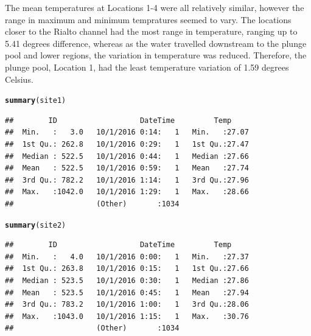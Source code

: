 \documentclass{article}\usepackage[]{graphicx}\usepackage[]{color}
\makeatletter
\newcommand{\hlstd}[1]{\textcolor[rgb]{0.345,0.345,0.345}{#1}}%
\newcommand{\hlkwd}[1]{\textcolor[rgb]{0.737,0.353,0.396}{\textbf{#1}}}%
\newenvironment{kframe}{%
 \def\at@end@of@kframe{}%
 \ifinner\ifhmode%
  \def\at@end@of@kframe{\end{minipage}}%
  \begin{minipage}{\columnwidth}%
 \fi\fi%
 \def\FrameCommand##1{\hskip\@totalleftmargin \hskip-\fboxsep
 \colorbox{shadecolor}{##1}\hskip-\fboxsep
     \hskip-\linewidth \hskip-\@totalleftmargin \hskip\columnwidth}%
 \MakeFramed {\advance\hsize-\width
   \@totalleftmargin\z@ \linewidth\hsize
   \@setminipage}}%
 {\par\unskip\endMakeFramed%
 \at@end@of@kframe}
\newenvironment{knitrout}{}{} %
\makeatother
\begin{document}
The mean temperatures at Locations 1-4 were all relatively similar, however the range in maximum and minimum tempratures seemed to vary. The locations closer to the Rialto channel had the most range in temperature, ranging up to 5.41 degrees difference, whereas as the water travelled downstream to the plunge pool and lower regions, the variation in temperature was reduced. Therefore, the plunge pool, Location 1, had the least temperature variation of 1.59 degrees Celsius.
\begin{knitrout}
\color{fgcolor}\begin{kframe}
\begin{alltt}
\hlkwd{summary}\hlstd{(site1)}
\end{alltt}
\begin{verbatim}
##        ID                   DateTime         Temp      
##  Min.   :   3.0   10/1/2016 0:14:   1   Min.   :27.07  
##  1st Qu.: 262.8   10/1/2016 0:29:   1   1st Qu.:27.47  
##  Median : 522.5   10/1/2016 0:44:   1   Median :27.66  
##  Mean   : 522.5   10/1/2016 0:59:   1   Mean   :27.74  
##  3rd Qu.: 782.2   10/1/2016 1:14:   1   3rd Qu.:27.96  
##  Max.   :1042.0   10/1/2016 1:29:   1   Max.   :28.66  
##                   (Other)       :1034
\end{verbatim}
\end{kframe}
\end{knitrout}

\begin{knitrout}
\color{fgcolor}\begin{kframe}
\begin{alltt}
\hlkwd{summary}\hlstd{(site2)}
\end{alltt}
\begin{verbatim}
##        ID                   DateTime         Temp      
##  Min.   :   4.0   10/1/2016 0:00:   1   Min.   :27.37  
##  1st Qu.: 263.8   10/1/2016 0:15:   1   1st Qu.:27.66  
##  Median : 523.5   10/1/2016 0:30:   1   Median :27.86  
##  Mean   : 523.5   10/1/2016 0:45:   1   Mean   :27.94  
##  3rd Qu.: 783.2   10/1/2016 1:00:   1   3rd Qu.:28.06  
##  Max.   :1043.0   10/1/2016 1:15:   1   Max.   :30.76  
##                   (Other)       :1034
\end{verbatim}
\end{kframe}
\end{knitrout}
\end{document}
